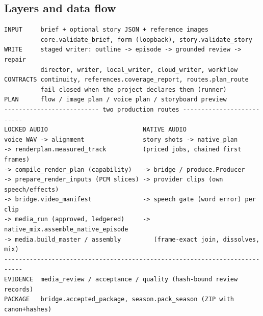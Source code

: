 \documentclass[11pt,a4paper]{article}
\begin{document}
\subsection{Layers and data flow}
\begin{verbatim}
INPUT     brief + optional story JSON + reference images
          core.validate_brief, form (loopback), story.validate_story
WRITE     staged writer: outline -> episode -> grounded review -> repair
          director, writer, local_writer, cloud_writer, workflow
CONTRACTS continuity, references.coverage_report, routes.plan_route
          fail closed when the project declares them (runner)
PLAN      flow / image plan / voice plan / storyboard preview
-------------------------- two production routes --------------------------
LOCKED AUDIO                          NATIVE AUDIO
voice WAV -> alignment                story shots -> native_plan
-> renderplan.measured_track          (priced jobs, chained first frames)
-> compile_render_plan (capability)   -> bridge / produce.Producer
-> prepare_render_inputs (PCM slices) -> provider clips (own speech/effects)
-> bridge.video_manifest              -> speech gate (word error) per clip
-> media_run (approved, ledgered)     -> native_mix.assemble_native_episode
-> media.build_master / assembly         (frame-exact join, dissolves, mix)
---------------------------------------------------------------------------
EVIDENCE  media_review / acceptance / quality (hash-bound review records)
PACKAGE   bridge.accepted_package, season.pack_season (ZIP with canon+hashes)
\end{verbatim}
\end{document}
